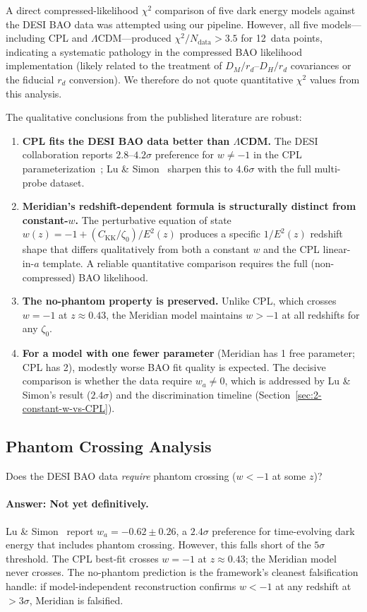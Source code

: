 A direct compressed-likelihood $\chi^2$ comparison of five dark energy models against the DESI BAO data was attempted using our pipeline. However, all five models---including CPL and $\Lambda$CDM---produced $\chi^2/N_\mathrm{data} > 3.5$ for 12~data points, indicating a systematic pathology in the compressed BAO likelihood implementation (likely related to the treatment of $D_M/r_d$--$D_H/r_d$ covariances or the fiducial $r_d$ conversion). We therefore do not quote quantitative $\chi^2$ values from this analysis.

The qualitative conclusions from the published literature are robust:
\begin{enumerate}
\item \textbf{CPL fits the DESI BAO data better than $\Lambda$CDM.} The DESI collaboration reports $2.8$--$4.2\sigma$ preference for $w \neq -1$ in the CPL parameterization~\cite{ch2:DESIDR2}; Lu \& Simon~\cite{ch2:LuSimon2026} sharpen this to $4.6\sigma$ with the full multi-probe dataset.
\item \textbf{Meridian's redshift-dependent formula is structurally distinct from constant-$w$.} The perturbative equation of state $w(z) = -1 + (C_\mathrm{KK}/\zeta_0)/E^2(z)$ produces a specific $1/E^2(z)$ redshift shape that differs qualitatively from both a constant $w$ and the CPL linear-in-$a$ template. A reliable quantitative comparison requires the full (non-compressed) BAO likelihood.
\item \textbf{The no-phantom property is preserved.} Unlike CPL, which crosses $w = -1$ at $z \approx 0.43$, the Meridian model maintains $w > -1$ at all redshifts for any $\zeta_0$.
\item \textbf{For a model with one fewer parameter} (Meridian has 1 free parameter; CPL has 2), modestly worse BAO fit quality is expected. The decisive comparison is whether the data require $w_a \neq 0$, which is addressed by Lu \& Simon's result ($2.4\sigma$) and the discrimination timeline (Section~\ref{sec:2-constant-w-vs-CPL}).
\end{enumerate}

\subsection{Phantom Crossing Analysis}
\label{sec:2-DESI-phantom}

Does the DESI BAO data \emph{require} phantom crossing ($w < -1$ at some $z$)?

\paragraph{Answer: Not yet definitively.} Lu \& Simon~\cite{ch2:LuSimon2026} report $w_a = -0.62 \pm 0.26$, a $2.4\sigma$ preference for time-evolving dark energy that includes phantom crossing. However, this falls short of the $5\sigma$ threshold. The CPL best-fit crosses $w = -1$ at $z \approx 0.43$; the Meridian model never crosses. The no-phantom prediction is the framework's cleanest falsification handle: if model-independent reconstruction confirms $w < -1$ at any redshift at $> 3\sigma$, Meridian is falsified.

